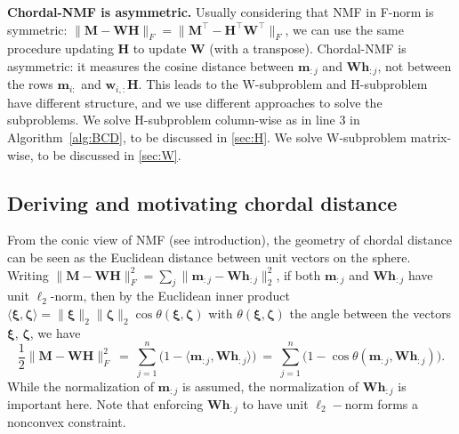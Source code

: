 \documentclass[sn-mathphys-num]{sn-jnl}
\def\H {\bm{H}}
\def\M {\bm{M}}
\def\W {\bm{W}}
\def\h {\bm{h}}
\def\m {\bm{m}}
\def\w {\bm{w}}
\def\bzeta    {\boldsymbol{\zeta}}
\def\bxi      {\boldsymbol{\xi}}
\begin{document}
\noindent\textbf{Chordal-NMF is asymmetric.}
Usually considering that NMF in F-norm is symmetric: $\| \M - \W \H \|_F = \| \M^\top - \H^\top \W^\top\|_F$, we can use the same procedure updating $\H$ to update $\W$ (with a transpose).
Chordal-NMF is asymmetric: it measures the cosine distance between $\m_{:j}$ and $\W\h_{:j}$, not between the rows $\m_{i:}$ and $\w_{i,:}\H$.
This leads to the W-subproblem and H-subproblem have different structure, and we use different approaches to solve the subproblems.
We solve H-subproblem column-wise as in line 3 in Algorithm~\ref{alg:BCD}, to be discussed in \textsection\ref{sec:H}.
We solve W-subproblem matrix-wise, to be discussed in \textsection\ref{sec:W}.






\subsection{Deriving and motivating chordal distance}\label{sec:chordal_distance}
From the conic view of NMF (see introduction), the geometry of chordal distance can be seen as the Euclidean distance between unit vectors on the sphere.
Writing $\| \M - \W \H \|_F^2 = \sum_j \| \m_{:j} - \W \h_{:j} \|_2^2$, 
if both $\m_{:j}$ and $\W \h_{:j}$ have unit $\ell_2$-norm, then by the Euclidean inner product $\langle \bxi, \bzeta \rangle = \| \bxi \|_2 \| \bzeta \|_2 \cos \theta(\bxi, \bzeta)$ with $\theta(\bxi, \bzeta)$ the angle between the vectors $\bxi$, $\bzeta$, we have
\begin{equation}\label{eqn:NMF_Fnorm_expand_unit}
\dfrac{1}{2} \| \M - \W \H \|_F^2
~=~
\displaystyle
\sum\limits_{j=1}^n 
\Big( 1 - \big\langle \m_{:j}, \W \h_{:j} \big\rangle 
\Big)
~=~
\displaystyle
\sum\limits_{j=1}^n 
\Big( 1 - \cos \theta(\m_{:j}, \W \h_{:j})
\Big)
.
\end{equation}
While the normalization of $\m_{:j}$ is assumed, the normalization of $\W \h_{:j}$ is important here.
Note that enforcing $\W \h_{:j}$ to have unit $\ell_2-$norm forms a nonconvex constraint.
\end{document}
